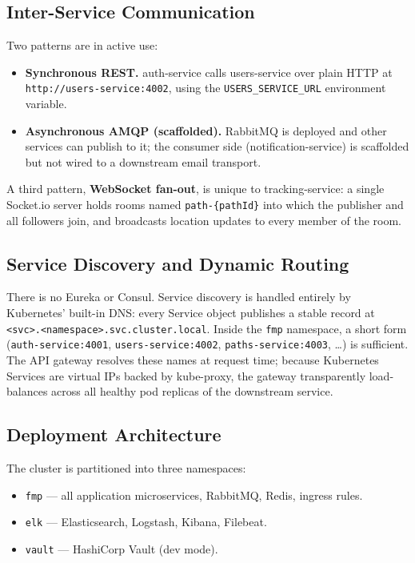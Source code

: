 \documentclass[11pt,a4paper]{article}
\begin{document}
\subsection{Inter-Service Communication}
Two patterns are in active use:

\begin{itemize}[leftmargin=*]
  \item \textbf{Synchronous REST.}  auth-service calls users-service
        over plain HTTP at \texttt{http://users-service:4002}, using
        the \texttt{USERS\_SERVICE\_URL} environment variable.
  \item \textbf{Asynchronous AMQP (scaffolded).}  RabbitMQ is deployed
        and other services can publish to it; the consumer side
        (notification-service) is scaffolded but not wired to a
        downstream email transport.
\end{itemize}

A third pattern, \textbf{WebSocket fan-out}, is unique to
tracking-service: a single Socket.io server holds rooms named
\texttt{path-\{pathId\}} into which the publisher and all followers
join, and broadcasts location updates to every member of the room.

\subsection{Service Discovery and Dynamic Routing}
There is no Eureka or Consul.  Service discovery is handled entirely
by Kubernetes' built-in DNS: every Service object publishes a stable
record at \texttt{<svc>.<namespace>.svc.cluster.local}.  Inside the
\texttt{fmp} namespace, a short form (\texttt{auth-service:4001},
\texttt{users-service:4002}, \texttt{paths-service:4003}, \dots) is
sufficient.  The API gateway resolves these names at request time;
because Kubernetes Services are virtual IPs backed by kube-proxy, the
gateway transparently load-balances across all healthy pod replicas
of the downstream service.

\subsection{Deployment Architecture}
The cluster is partitioned into three namespaces:

\begin{itemize}[leftmargin=*]
  \item \texttt{fmp} — all application microservices, RabbitMQ, Redis,
        ingress rules.
  \item \texttt{elk} — Elasticsearch, Logstash, Kibana, Filebeat.
  \item \texttt{vault} — HashiCorp Vault (dev mode).
\end{itemize}
\end{document}
